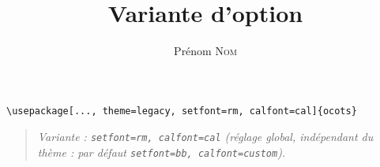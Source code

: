 \documentclass[11pt]{ocots-book}
\title{Variante d'option}
\author{Prénom \textsc{Nom}}
\newcommand{\ocotsvariantnote}[1]{\begin{quote}\itshape Variante : #1\end{quote}}
\begin{document}
\maketitle

\begin{lstlisting}
\usepackage[..., theme=legacy, setfont=rm, calfont=cal]{ocots}
\end{lstlisting}
\ocotsvariantnote{\texttt{setfont=rm, calfont=cal} (r\'eglage global, ind\'ependant du th\`eme : par d\'efaut \texttt{setfont=bb, calfont=custom}).}

\end{document}

